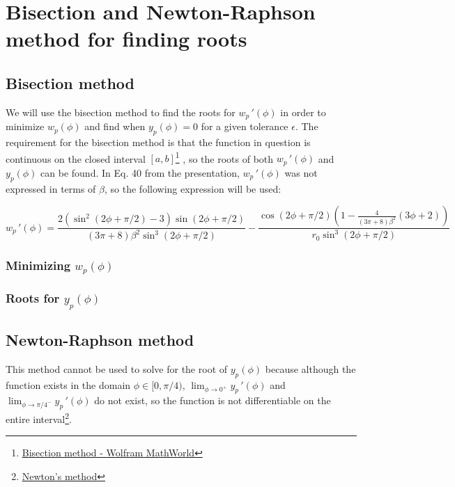 \section{Bisection and Newton-Raphson method for finding roots}

\subsection{Bisection method}

We will use the bisection method to find the roots for $w_p\,'(\phi)$ 
in order to minimize $w_p(\phi)$ and find when $y_p(\phi)=0$ for a given tolerance $\epsilon$. 
The requirement for the bisection method is that the function in question is continuous on the closed interval $[a,b]$\footnote{\href{https://mathworld.wolfram.com/Bisection.html}{Bisection method - Wolfram MathWorld}}
, so the roots of both $w_p\,'(\phi)$ and $y_p(\phi)$ can be found.
In Eq. 40 from the presentation, $w_p\,'(\phi)$ was not expressed in terms of $\beta$, 
so the following expression will be used:

\begin{equation}
    w_p\,'(\phi)=\frac{2(\sin^2(2\phi+\pi/2)-3)\sin(2\phi+\pi/2)}{(3\pi+8)\beta^2\sin^3(2\phi+\pi/2)}
    -\frac{\cos(2\phi+\pi/2)\left(1-\frac{4}{(3\pi+8)\beta^2}(3\phi+2)\right)}{r_0\sin^3(2\phi+\pi/2)}
\end{equation}

\subsubsection{Minimizing \texorpdfstring{$w_p(\phi)$}{}}

\subsubsection{Roots for \texorpdfstring{$y_p(\phi)$}{}}

\subsection{Newton-Raphson method}

This method cannot be used to solve for the root of $y_p(\phi)$ because although the function exists in the domain $\phi\in[0,\pi/4)$,
$\lim_{\phi\to 0^+}y_p\,'(\phi)$ and $\lim_{\phi\to \pi/4^-}y_p\,'(\phi)$ do not exist, so the function is not differentiable on the entire interval\footnote{\href{http://amsi.org.au/ESA_Senior_Years/SeniorTopic3/3j/3j_2content_2.html}{Newton's method}}.

